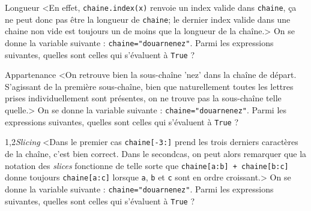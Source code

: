 \begin{quiz}[title={Séquences}]
\vspace{-\baselineskip}
\begin{quizquestion}[b]{2}{1}{Longueur}
<En effet, \texttt{chaine.index(x)} renvoie un index valide dans \texttt{chaine}, ça ne peut donc pas être la longueur de \texttt{chaine}; le dernier index valide dans une chaine non vide est toujours un de moins que la longueur de la chaîne.> 
On se donne la variable suivante : \texttt{chaine="douarnenez"}. Parmi les expressions suivantes, quelles sont celles qui s'évaluent à \texttt{True} ?
\end{quizquestion}

\begin{quizquestion}[b]{2}{1}{Appartenance}
<On retrouve bien la sous-chaîne 'nez' dans la chaîne de départ.
S'agissant de la première sous-chaîne, bien que naturellement toutes les lettres prises individuellement sont présentes, on ne trouve pas la sous-chaîne telle quelle.> 
On se donne la variable suivante : \texttt{chaine="douarnenez"}. Parmi les expressions suivantes, quelles sont celles qui s'évaluent à \texttt{True} ?
\end{quizquestion}

\begin{quizquestion}[b]{1,2}{}{{\itshape Slicing}}
<Dans le premier cas \texttt{chaine[-3:]} prend les trois derniers caractères de la chaî\-ne, c'est bien correct.
Dans le second\linebreak cas, on peut alors remarquer que la notation des \textit{slices} fonctionne de telle sorte que \texttt{chaine[a:b] + chaine[b:c]} donne toujours \texttt{chaine[a:c]} lorsque \texttt{a}, \texttt{b} et \texttt{c} sont en ordre croissant.> 
On se donne la variable suivante : \texttt{chaine="douarnenez"}. Parmi les expressions suivantes, quelles sont celles qui s'évaluent à \texttt{True} ?
\end{quizquestion}
\end{quiz}

